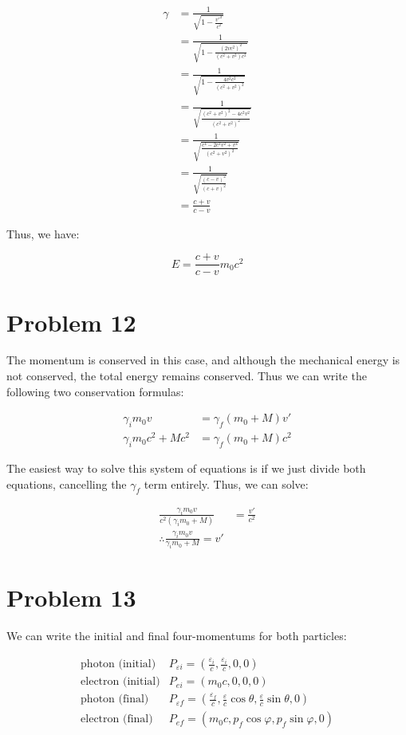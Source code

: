 \documentclass{article}
\theoremstyle{definition}
\numberwithin{equation}{section}
\numberwithin{definition}{section}
\begin{document}
	\begin{align*}
		\gamma &= \frac{1}{\sqrt{1 - \frac{v'^2}{c^2}}}\\
		&= \frac{1}{\sqrt{1-\frac{(2vc^2)^2}{(c^2 + v^2)c^2}}}\\
		&= \frac{1}{\sqrt{1-\frac{4v^2c^2}{(c^2 + v^2)^2}}}\\
		&= \frac{1}{\sqrt{\frac{(c^2 + v^2)^2 - 4c^2v^2}{(c^2 + v^2)^2}}}\\
		&= \frac{1}{\sqrt{\frac{c^4 - 2c^2v^2 + v^4}{(c^2 +v^2)^2}}}\\
		&= \frac{1}{\sqrt{\frac{(c-v)^2}{(c+v)^2}}}\\
		&= \frac{c+v}{c-v}
	\end{align*}

	Thus, we have:
	
	\[ E = \frac{c+v}{c-v}m_0c^2\]


	\section{Problem 12}
	
	The momentum is conserved in this case, and although the mechanical energy is not conserved, the total energy remains conserved. Thus we can write the following two conservation formulas:
	
	\begin{align*}
		\gamma_im_0v &= \gamma_f(m_0 + M)v'\\
		\gamma_im_0c^2 + Mc^2 &= \gamma_f (m_0 + M)c^2
	\end{align*}

	The easiest way to solve this system of equations is if we just divide both equations, cancelling the $\gamma_f$ term entirely. Thus, we can solve:
	
	\begin{align*}
		\frac{\gamma_i m_0v}{c^2(\gamma_im_0 + M)} &= \frac{v'}{c^2}\\
		\therefore \frac{\gamma_i m_0v}{\gamma_im_0 + M} = v' 
	\end{align*}


	\section{Problem 13}
	
	We can write the initial and final four-momentums for both particles:
	
	\begin{align*}
		\text{photon (initial)}& P_{\varepsilon i} = \left(\frac{\varepsilon_i}{c}, \frac{\varepsilon_i}{c}, 0, 0\right)\\
		\text{electron (initial)}& P_{ei} = (m_0c, 0, 0, 0)\\
		\text{photon (final)}& P_{\varepsilon f} = \left(\frac{\varepsilon_f}{c}, \frac{\varepsilon}{c}\cos\theta, \frac{\varepsilon}{c} \sin\theta, 0\right)\\
		\text{electron (final)}& P_{ef} = (m_0c, p_f \cos \varphi, p_f\sin\varphi, 0)
	\end{align*}
\end{document}
